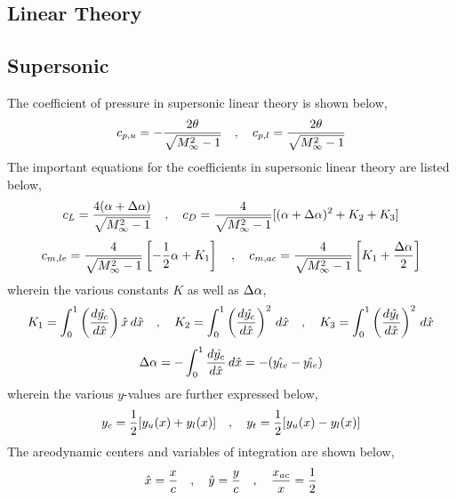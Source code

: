 \documentclass[a4paper, 12pt]{report}
\begin{document}
\begin{center}
\section{Linear Theory}
\begin{comment}
\end{comment}
\subsection{Supersonic}
\begin{comment}
\end{comment}
The coefficient of pressure in supersonic linear theory is shown below,
$$c_{p,u} = -\frac{2\theta}{\sqrt{M_\infty^2-1}} \quad,\quad c_{p,l} = \frac{2\theta}{\sqrt{M_\infty^2-1}}$$
The important equations for the coefficients in supersonic linear theory are listed below,
$$c_L = \frac{4(\alpha+\Delta \alpha)}{\sqrt{M_\infty^2-1}} \quad,\quad c_D = \frac{4}{\sqrt{M_\infty^2-1}}[(\alpha+\Delta \alpha)^2+K_2+K_3]$$
$$c_{m,le} = \frac{4}{\sqrt{M_\infty^2-1}}\left[-\frac{1}{2}\alpha+K_1\right] \quad,\quad c_{m,ac} = \frac{4}{\sqrt{M_\infty^2-1}}\left[K_1+\frac{\Delta\alpha}{2}\right]$$
wherein the various constants $K$ as well as $\Delta \alpha$,
$$K_1 = \int^{1}_{0}\left(\frac{d\hat{y_c}}{d\hat{x}}\right)\hat{x}\,d\hat{x} \quad,\quad K_2 = \int^{1}_{0}\left(\frac{d\hat{y_c}}{d\hat{x}}\right)^2\,d\hat{x} \quad,\quad K_3 = \int^{1}_{0}\left(\frac{d\hat{y_t}}{d\hat{x}}\right)^2\,d\hat{x}$$
$$\Delta \alpha = -\int^{1}_{0}\frac{d\hat{y_c}}{d\hat{x}}\,d\hat{x} = -(\hat{y_{te}}-\hat{y_{le}})$$
wherein the various $y$-values are further expressed below,
$$y_c = \frac{1}{2}[y_u(x)+y_l(x)] \quad,\quad y_t = \frac{1}{2}[y_u(x)-y_l(x)]$$
The areodynamic centers and variables of integration are shown below,
$$\hat{x} = \frac{x}{c} \quad,\quad \hat{y} = \frac{y}{c} \quad,\quad \frac{x_{ac}}{x}=\frac{1}{2}$$

\end{center}
\end{document}
